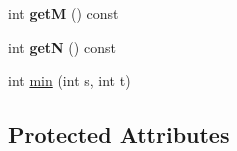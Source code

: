 \begin{DoxyCompactItemize}
\item 
\hypertarget{classIRowColumnDS_aa4914b0aeae6902ecfc4c88f6f0b39bf}{
int {\bfseries getM} () const }
\label{classIRowColumnDS_aa4914b0aeae6902ecfc4c88f6f0b39bf}

\item 
\hypertarget{classIRowColumnDS_a09a3057692b02533c04c2c7854f5ae00}{
int {\bfseries getN} () const }
\label{classIRowColumnDS_a09a3057692b02533c04c2c7854f5ae00}

\item 
int \hyperlink{classIRowColumnDS_ac7f6fa1d2c803ae267146dec1cb129c7}{min} (int s, int t)
\end{DoxyCompactItemize}
\subsection*{Protected Attributes}
